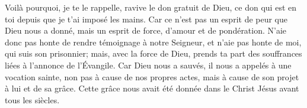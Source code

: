 Voilà pourquoi, je te le rappelle, ravive le don gratuit de Dieu,
	ce don qui est en toi depuis que je t’ai imposé les mains.
Car ce n’est pas un esprit de peur que Dieu nous a donné,
	mais un esprit de force, d’amour et de pondération.
N’aie donc pas honte de rendre témoignage à notre Seigneur,
	et n’aie pas honte de moi, qui suis son prisonnier;
	mais, avec la force de Dieu,
	prends ta part des souffrances liées à l’annonce de l’Évangile.
Car Dieu nous a sauvés, il nous a appelés à une vocation sainte,
	non pas à cause de nos propres actes, mais à cause de son projet à lui et de sa grâce.
Cette grâce nous avait été donnée dans le Christ Jésus avant tous les siècles.